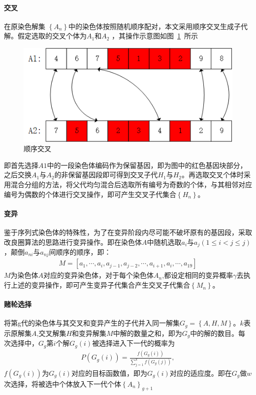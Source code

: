 \documentclass{whutmod}
\begin{document}
\begin{table}[H]
\begin{tablenotes}
		\paragraph{交叉}
		在原染色解集 $\left \{ A_n \right \}$中的染色体按照随机顺序配对，本文采用顺序交叉生成子代解。假定选取的交叉个体为$A_1$和$A_2$    ，其操作示意图如图~\ref{gbf}~所示
		\begin{figure}[H]
			\centering
			\includegraphics[width=.75\textwidth]{figures/cross.png}
			\caption{顺序交叉}\label{gbf}
		\end{figure}
		
		即首先选择$A1$中的一段染色体编码作为保留基因，即为图中的红色基因块部分，之后交换$A_1$与$A_2$的非保留基因段即可得到交叉子代$H_1$与$H_2$。再选取交叉个体时采用混合分组的方法，将父代均匀混合后选取所有编号为奇数的个体，与其相邻对应编号为偶数的个体进行交叉操作，即可产生交叉子代集合$\left \{ H_n \right \}$。
	     
		
		
		\paragraph{变异}
		鉴于序列式染色体的特殊性，为了在变异阶段内尽可能不破坏原有的基因段，采取改良圈算法的思路进行变异操作。即在染色体$A$中随机选取$a_{i}$与$a_{j}(1\leqslant i<j\leqslant j )$，颠倒$a_{ni}$与$a_{nj}$间顺序的顺序，即：
		\begin{gather}
		M=[a_{1},\cdots,a_{i},a_{j-1},a_{j-2},\cdots,a_{i+1},a_{i},\cdots,a_{19}]
		\end{gather}
		$M$为染色体$A$对应的变异染色体，对于每个染色体$A_n$,都设定相同的变异概率$\gamma$去执行上述的变异操作，即可产生变异子代集合产生交叉子代集合$\left \{ M_n \right \}$。 
		\paragraph{赌轮选择}
		将第g代的染色体与其交叉和变异产生的子代并入同一解集$G_g=\left \{A,H,M\right \}$。$k$表示原解集$A$,交叉解集$H$和变异解集$M$中解的数量之和，即为$G_g$中的解的数目。每次选择中，$G_g$第$i$个解$G_g(i)$被选择进入下一代的概率为
		\begin{gather}
		P(G_{g}(i))=\frac{f(G_{g}(i))}{\sum_{j=1}^{k}f(G_{g}(j))},
		\end{gather}
		$f(G_{g}(i))$为$G_{g}(i)$对应的目标函数值，即为$G_{g}(i)$对应的适应度。即在$G_g$做$w$次选择，将被选中个体放入下一代个体$\left \{A_n  \right \}_{g+1}$

\end{tablenotes}
\end{table}
\end{document}
